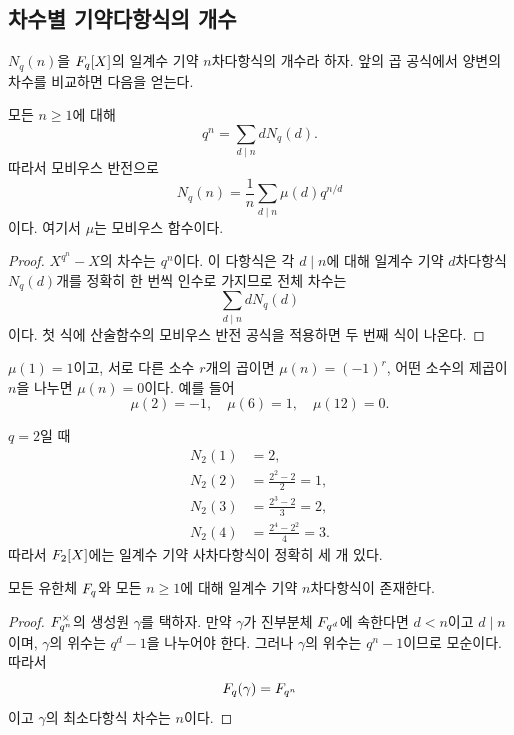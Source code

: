 \subsection{차수별 기약다항식의 개수}

$N_q(n)$을 $F_q[X]$의 일계수 기약 $n$차다항식의 개수라 하자. 앞의 곱 공식에서 양변의 차수를 비교하면 다음을 얻는다.

\begin{proposition}
모든 $n\ge1$에 대해
\[
  q^n=\sum_{d\mid n}dN_q(d).
\]
따라서 모비우스 반전으로
\[
  N_q(n)
  =\frac1n\sum_{d\mid n}\mu(d)q^{n/d}
\]
이다. 여기서 $\mu$는 모비우스 함수이다.
\end{proposition}

\begin{proof}
$X^{q^n}-X$의 차수는 $q^n$이다. 이 다항식은 각 $d\mid n$에 대해 일계수 기약 $d$차다항식 $N_q(d)$개를 정확히 한 번씩 인수로 가지므로 전체 차수는
\[
  \sum_{d\mid n}dN_q(d)
\]
이다. 첫 식에 산술함수의 모비우스 반전 공식을 적용하면 두 번째 식이 나온다.
\end{proof}

\begin{remark}[모비우스 함수]
$\mu(1)=1$이고, 서로 다른 소수 $r$개의 곱이면 $\mu(n)=(-1)^r$, 어떤 소수의 제곱이 $n$을 나누면 $\mu(n)=0$이다. 예를 들어
\[
  \mu(2)=-1,\quad \mu(6)=1,\quad \mu(12)=0.
\]
\end{remark}

\begin{example}
$q=2$일 때
\[
\begin{aligned}
N_2(1)&=2,\\
N_2(2)&=\frac{2^2-2}{2}=1,\\
N_2(3)&=\frac{2^3-2}{3}=2,\\
N_2(4)&=\frac{2^4-2^2}{4}=3.
\end{aligned}
\]
따라서 $F_2[X]$에는 일계수 기약 사차다항식이 정확히 세 개 있다.
\end{example}

\begin{corollary}
모든 유한체 $F_q$와 모든 $n\ge1$에 대해 일계수 기약 $n$차다항식이 존재한다.
\end{corollary}

\begin{proof}
$F_{q^n}^\times$의 생성원 $\gamma$를 택하자. 만약 $\gamma$가 진부분체 $F_{q^d}$에 속한다면 $d<n$이고 $d\mid n$이며, $\gamma$의 위수는 $q^d-1$을 나누어야 한다. 그러나 $\gamma$의 위수는 $q^n-1$이므로 모순이다. 따라서
\[
  F_q(\gamma)=F_{q^n}
\]
이고 $\gamma$의 최소다항식 차수는 $n$이다.
\end{proof}


